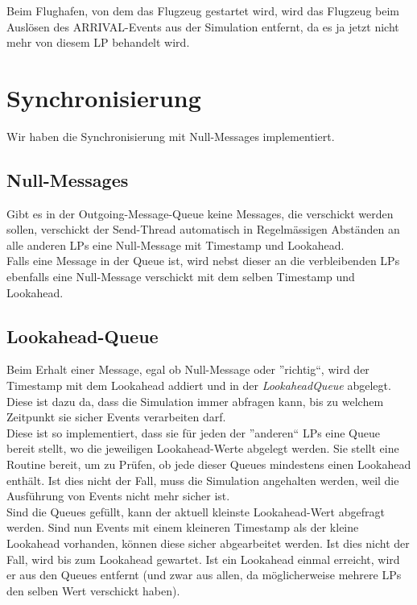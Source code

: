 \documentclass[oneside,DIV12,BCOR0.5cm,bibliography=totoc]{template}
\begin{document}
\begin{empfile}
Beim Flughafen, von dem das Flugzeug gestartet wird, wird das Flugzeug
beim Auslösen des ARRIVAL-Events aus der Simulation entfernt, da es ja
jetzt nicht mehr von diesem LP behandelt wird.\\

\section{Synchronisierung}

Wir haben die Synchronisierung mit Null-Messages implementiert.

\subsection{Null-Messages}

Gibt es in der Outgoing-Message-Queue keine Messages, die verschickt
werden sollen, verschickt der Send-Thread automatisch in Regelmässigen
Abständen an alle anderen LPs eine Null-Message mit Timestamp und 
Lookahead.\\

Falls eine Message in der Queue ist, wird nebst dieser an die 
verbleibenden LPs ebenfalls eine Null-Message verschickt mit dem
selben Timestamp und Lookahead.

\subsection{Lookahead-Queue}

Beim Erhalt einer Message, egal ob Null-Message oder ''richtig``, wird
der Timestamp mit dem Lookahead addiert und in der \emph{LookaheadQueue}
abgelegt. Diese ist dazu da, dass die Simulation immer abfragen kann,
bis zu welchem Zeitpunkt sie sicher Events verarbeiten darf.\\

Diese ist so implementiert, dass sie für jeden der ''anderen`` LPs
eine Queue bereit stellt, wo die jeweiligen Lookahead-Werte abgelegt
werden. Sie stellt eine Routine bereit, um zu Prüfen, ob jede dieser
Queues mindestens einen Lookahead enthält. Ist dies nicht der Fall,
muss die Simulation angehalten werden, weil die Ausführung von Events
nicht mehr sicher ist.\\

Sind die Queues gefüllt, kann der aktuell kleinste Lookahead-Wert
abgefragt werden. Sind nun Events mit einem kleineren Timestamp als der
kleine Lookahead vorhanden, können diese sicher abgearbeitet werden. Ist
dies nicht der Fall, wird bis zum Lookahead gewartet. Ist ein Lookahead
einmal erreicht, wird er aus den Queues entfernt (und zwar aus allen,
da möglicherweise mehrere LPs den selben Wert verschickt haben).


\end{empfile}
\end{document}
